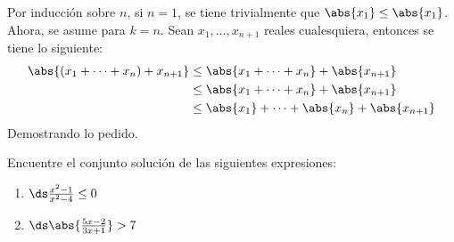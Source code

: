 \documentclass{ayudantia}
\begin{document}
\begin{ans}
    \begin{sol}
        Por inducción sobre \(n\), si \(n=1\), se tiene trivialmente que \(\abs{x_1}\leq\abs{x_1}\). Ahora, se asume para \(k=n\). Sean \(x_1,\dots,x_{n+1}\) reales cualesquiera, entonces se tiene lo siguiente:
        \begin{align*}
            \abs{(x_1+\dots+x_n)+x_{n+1}}&\leq\abs{x_1+\dots+x_n}+\abs{x_{n+1}}\\
            &\leq\abs{x_1+\dots+x_n}+\abs{x_{n+1}}\\
            &\leq\abs{x_1}+\dots+\abs{x_n}+\abs{x_{n+1}}
        \end{align*}
        Demostrando lo pedido.
    \end{sol}
\end{ans}


\begin{prob}
    Encuentre el conjunto solución de las siguientes expresiones:
    \begin{multicols}{2}
        \begin{enumerate}
            \item \(\ds\frac{x^2-1}{x^2-4}\leq 0\)
            \item \(\ds\abs{\frac{5x-2}{3x+1}}> 7\)
        \end{enumerate}
    \end{multicols}
\end{prob}
\end{document}
